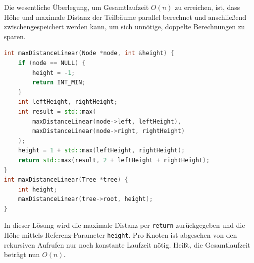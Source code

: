 \documentclass[11pt,a4paper]{article}
\begin{document}
\begin{loesung}
    Die wesentliche Überlegung, um Gesamtlaufzeit $O(n)$ zu erreichen, ist, dass Höhe und maximale Distanz der Teilbäume parallel berechnet und anschließend zwischengespeichert werden kann, um sich unnötige, doppelte Berechnungen zu sparen.
    \begin{lstlisting}[language=c++]
int maxDistanceLinear(Node *node, int &height) {
    if (node == NULL) {
        height = -1;
        return INT_MIN;
    }
    int leftHeight, rightHeight;
    int result = std::max(
        maxDistanceLinear(node->left, leftHeight),
        maxDistanceLinear(node->right, rightHeight)
    );
    height = 1 + std::max(leftHeight, rightHeight);
    return std::max(result, 2 + leftHeight + rightHeight);
}
int maxDistanceLinear(Tree *tree) {
    int height;
    maxDistanceLinear(tree->root, height);
}
    \end{lstlisting}
    In dieser Lösung wird die maximale Distanz per \texttt{return} zurückgegeben und die Höhe mittels Referenz-Parameter \texttt{height}.
    Pro Knoten ist abgesehen von den rekursiven Aufrufen nur noch konstante Laufzeit nötig.
    Heißt, die Gesamtlaufzeit beträgt nun $O(n)$.
\end{loesung}
\end{document}
